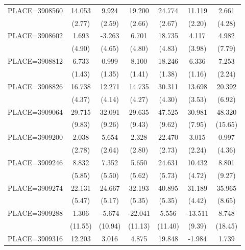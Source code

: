 {\begin{tabular}{l*{6}{c}}
PLACE=3908560       &      14.053&       9.924&      19.200&      24.774&      11.119&       2.661\\
                    &      (2.77)&      (2.59)&      (2.66)&      (2.67)&      (2.20)&      (4.28)\\
PLACE=3908602       &       1.693&      -3.263&       6.701&      18.735&       4.117&       4.982\\
                    &      (4.90)&      (4.65)&      (4.80)&      (4.83)&      (3.98)&      (7.79)\\
PLACE=3908812       &       6.733&       0.999&       8.100&      18.246&       6.336&       7.253\\
                    &      (1.43)&      (1.35)&      (1.41)&      (1.38)&      (1.16)&      (2.24)\\
PLACE=3908826       &      16.738&      12.271&      14.735&      30.311&      13.698&      20.392\\
                    &      (4.37)&      (4.14)&      (4.27)&      (4.30)&      (3.53)&      (6.92)\\
PLACE=3909064       &      29.715&      32.091&      29.635&      47.525&      30.981&      48.320\\
                    &      (9.83)&      (9.26)&      (9.43)&      (9.62)&      (7.95)&     (15.65)\\
PLACE=3909200       &       2.038&       5.654&       2.328&      22.470&       3.015&       0.997\\
                    &      (2.78)&      (2.64)&      (2.80)&      (2.73)&      (2.24)&      (4.36)\\
PLACE=3909246       &       8.832&       7.352&       5.650&      24.631&      10.432&       8.801\\
                    &      (5.85)&      (5.50)&      (5.62)&      (5.73)&      (4.72)&      (9.27)\\
PLACE=3909274       &      22.131&      24.667&      32.193&      40.895&      31.189&      35.965\\
                    &      (5.47)&      (5.17)&      (5.35)&      (5.35)&      (4.42)&      (8.65)\\
PLACE=3909288       &       1.306&      -5.674&     -22.041&       5.556&     -13.511&       8.748\\
                    &     (11.55)&     (10.94)&     (11.13)&     (11.40)&      (9.39)&     (18.45)\\
PLACE=3909316       &      12.203&       3.016&       4.875&      19.848&      -1.984&       1.739\\

\end{tabular}}
